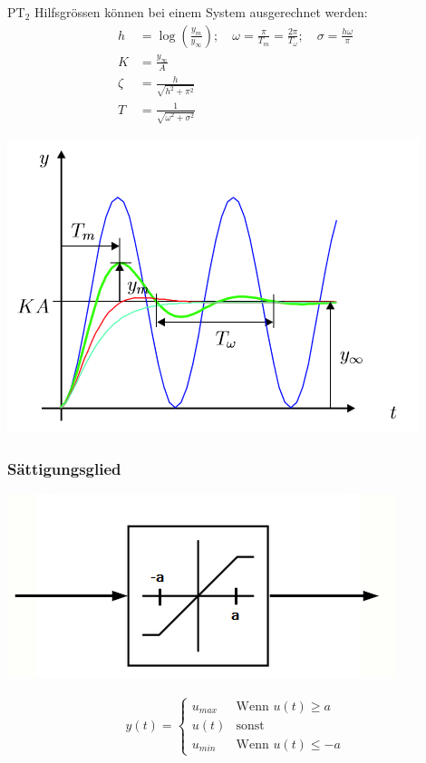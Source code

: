 PT$_2$ Hilfsgrössen können bei einem System ausgerechnet werden:
\begin{align*}
	h &= \log\left(\frac{y_m}{y_\infty}\right) ;\quad \omega = \frac{\pi}{T_m} = \frac{2\pi}{T_\omega} ;\quad \sigma = \frac{h\omega}{\pi}\\
	K &= \frac{y_\infty}{A}\\
	\zeta &= \frac{h}{\sqrt{h^2 + \pi^2}}\\
	T &= \frac{1}{\sqrt{\omega^2 + \sigma^2}}
\end{align*}
\begin{center}
	\includegraphics[width=0.6\columnwidth]{Images/pt2_graph}
\end{center}


\subsubsection{Sättigungsglied}
\begin{center}
	\begin{minipage}{0.20\textwidth}
		\begin{center}
			\includegraphics[width=0.5\linewidth,keepaspectratio=true]{Images/saturationglied}\\
		\end{center}
	\end{minipage}%
	\begin{minipage}{0.3\textwidth}
		\begin{align*}
			y(t) = 	\begin{cases}
				u_{max} & \text{Wenn } u(t) \ge a\\
				u(t) & \text{sonst } \\
				u_{min} & \text{Wenn }  u(t) \le -a
			\end{cases}
		\end{align*}
	\end{minipage}
\end{center}

